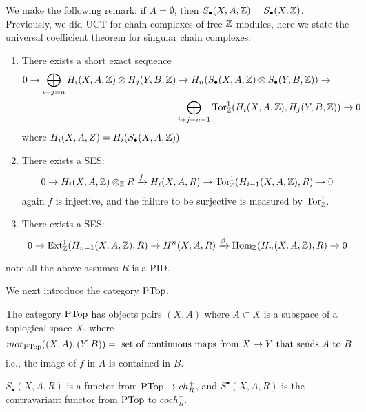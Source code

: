We make the following remark: if $A=\emptyset$, then $S_\bullet(X,A,\mathbb{Z})=S_\bullet(X,\mathbb{Z})$. Previously, we did UCT for chain complexes of free $\mathbb{Z}$-modules, here we state the universal coefficient theorem for singular chain complexes:
\begin{thm}
    \begin{enumerate}
        We have some SES's:
        \item There exists a short exact sequence 
        \begin{align*}
            0\to\bigoplus_{i+j=n}H_i(X,A,\mathbb{Z})\otimes H_j(Y,B,\mathbb{Z})&\to H_n(S_\bullet(X,A,\mathbb{Z})\otimes S_\bullet(Y,B,\mathbb{Z}))\to\\
            &\bigoplus_{i+j=n-1}\text{Tor}_{\mathbb{Z}}^1(H_i(X,A,\mathbb{Z}),H_j(Y,B,\mathbb{Z}))\to 0
        \end{align*}
        where $H_i(X,A,Z)=H_i(S_\bullet(X,A,\mathbb{Z}))$
        \item There exists a SES:
        \begin{align*}
            0\to H_i(X,A,\mathbb{Z})\otimes_{\mathbb{Z}} R\xrightarrow{f} H_i(X,A,R)\to\text{Tor}_{\mathbb{Z}}^1(H_{i-1}(X,A,\mathbb{Z}),R)\to 0
        \end{align*}
        again $f$ is injective, and the failure to be surjective is measured by $\text{Tor}_{\mathbb{Z}}^1$.
        \item There exists a SES:
        \begin{equation*}
            0\to\text{Ext}_{\mathbb{Z}}^1(H_{n-1}(X,A,\mathbb{Z}),R)\to H^n(X,A,R)\xrightarrow{\beta}\text{Hom}_{\mathbb{Z}}(H_n(X,A,\mathbb{Z}), R)\to 0
        \end{equation*}
    \end{enumerate}
    note all the above assumes $R$ is a PID.
    
\end{thm}
We next introduce the category $\ptop$.
\begin{defn}[$\ptop$]
    The category $\ptop$ has objects pairs $(X,A)$ where $A\subset X$ is a subspace of a toplogical space $X$. where 
    \begin{equation*}
        mor_{\text{PTop}}((X,A),(Y,B))=\text{ set of continuous maps from $X\to Y$ that sends $A$ to $B$}
    \end{equation*}
    i.e., the image of $f$ in $A$ is contained in $B$.
\end{defn}
\begin{thm}
    $S_\bullet(X,A,R)$ is a functor from $\text{PTop}\to ch_R^+$, and $S^\bullet(X,A,R)$ is the contravariant functor from $\ptop$ to $coch_R^+$.
\end{thm}
